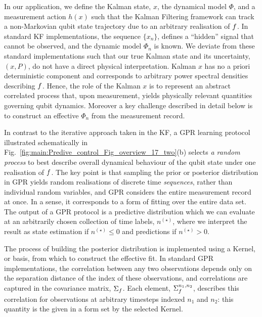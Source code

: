  In our application, we define the Kalman state, $x$, the dynamical model $\Phi$, and a measurement action $h(x)$ such that the Kalman Filtering framework can track a non-Markovian qubit state trajectory due to an arbitrary realisation of $f$. In standard KF implementations, the sequence $\{x_n\}$, defines a ``hidden'' signal that cannot be observed, and the dynamic model $\Phi_n$ is known.  We deviate from these standard implementations such that our true Kalman state and its uncertainty, $(x, P)$, do not have a direct physical interpretation.  Kalman $x$ has no a priori deterministic component and corresponds to arbitrary power spectral densities describing $f$. Hence, the role of the Kalman $x$ is to represent an abstract correlated process that, upon measurement, yields physically relevant quantities governing qubit dynamics.  Moreover a key challenge described in detail below is to construct an effective $\Phi_{n}$ from the measurement record.   

In contrast to the iterative approach taken in the KF, a GPR learning protocol illustrated schematically in Fig.~\ref{fig:main:Predive_control_Fig_overview_17_two}(b) selects \textit{a random process} to best describe overall dynamical behaviour of the qubit state under one realisation of $f$. The key point is that sampling the prior or posterior distribution in GPR yields random realisations of discrete time \textit{sequences}, rather than individual random variables, and GPR considers the entire measurement record at once.  In a sense, it corresponds to a form of fitting over the entire data set.  The output of a GPR protocol is a predictive distribution which we can evaluate at an arbitrarily chosen collection of time labels, $n^{(\star)}$, where we interpret the result as state estimation if $n^{(\star)} \leq 0$ and predictions if $n^{(\star)}>0$. 

The process of building the posterior distribution is implemented using a Kernel, or basis, from which to construct the effective fit.  In standard GPR implementations, the correlation between any two observations depends only on the separation distance of the index of these observations, and correlations are captured in the covariance matrix, $\Sigma_f$. Each element, $\Sigma_f^{n_1, n_2}$, describes this correlation for observations at arbitrary timesteps indexed $n_1$ and $n_2$: this quantity is the given in a form set by the selected Kernel. 

